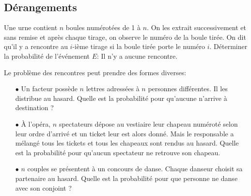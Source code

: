 \subsection{Dérangements}

\begin{exercice} 
Une urne contient $n$ boules num\'erot\'ees de 1 \`a $n$. On les extrait successivement et sans remise et apr\`es chaque tirage, on observe le num\'ero de la boule tir\'ee. On dit qu'il y a rencontre au $i$-i\`eme tirage si la boule tir\'ee porte le num\'ero $i$. D\'eterminer la probabilit\'e de l'\'ev\'enement $E$: \og Il n'y a aucune rencontre\fg.

\begin{rems}
Le probl\`{e}me des rencontres peut prendre des formes diverses:
\begin{itemize}
\item[$\bullet$] Un facteur poss\`{e}de $n$ lettres adress\'ees \`{a} $n$ personnes diff\'erentes. Il les distribue au hasard. Quelle est la probabilit\'e pour qu'aucune n'arrive \`{a} destination ?
\item[$\bullet$] \`{A} l'op\'era, $n$ spectateurs d\'epose au vestiaire leur chapeau num\'erot\'e selon leur ordre d'arriv\'e et un ticket leur est alors donn\'e. Mais le responsable a m\'elang\'e tous les tickets et tous les chapeaux sont rendus au hasard. Quelle est la probabilit\'e pour qu'aucun spectateur ne retrouve son chapeau.
\item[$\bullet$] $n$ couples se pr\'esentent \`{a} un concours de danse. Chaque danseur choisit sa partenaire au hasard. Quelle est la probabilit\'e pour que personne ne danse avec son conjoint ?
\end{itemize}
\end{rems}

\end{exercice}



